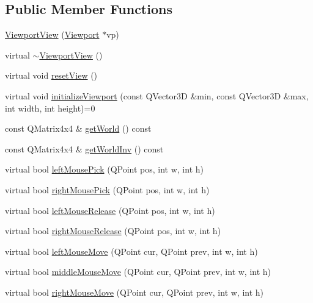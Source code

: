 \subsection*{Public Member Functions}
\begin{DoxyCompactItemize}
\item 
\hyperlink{classShipCAD_1_1ViewportView_a725088d3f0e113c97ae52cccab7fce42}{Viewport\-View} (\hyperlink{classShipCAD_1_1Viewport}{Viewport} $\ast$vp)
\item 
virtual \hyperlink{classShipCAD_1_1ViewportView_a75f58efbb601f46ea20b70b1370cee1a}{$\sim$\-Viewport\-View} ()
\item 
virtual void \hyperlink{classShipCAD_1_1ViewportView_ab70e778772325a67610d983f630c2c3d}{reset\-View} ()
\item 
virtual void \hyperlink{classShipCAD_1_1ViewportView_ad1c89a6e34b7b3795a7f21e67181dc0f}{initialize\-Viewport} (const Q\-Vector3\-D \&min, const Q\-Vector3\-D \&max, int width, int height)=0
\item 
const Q\-Matrix4x4 \& \hyperlink{classShipCAD_1_1ViewportView_a0be1613b2ae2087da00811f2bdb0bd45}{get\-World} () const 
\item 
const Q\-Matrix4x4 \& \hyperlink{classShipCAD_1_1ViewportView_a6bffec9328b29bf40c868f2862daebe0}{get\-World\-Inv} () const 
\item 
virtual bool \hyperlink{classShipCAD_1_1ViewportView_ac1226ebc09cbc0ee33a53fc6fec9cd09}{left\-Mouse\-Pick} (Q\-Point pos, int w, int h)
\item 
virtual bool \hyperlink{classShipCAD_1_1ViewportView_a1e67e403d7307d3828336edbc1ded2f3}{right\-Mouse\-Pick} (Q\-Point pos, int w, int h)
\item 
virtual bool \hyperlink{classShipCAD_1_1ViewportView_ad74e96e8fef750466b2771f8fc48900a}{left\-Mouse\-Release} (Q\-Point pos, int w, int h)
\item 
virtual bool \hyperlink{classShipCAD_1_1ViewportView_aaeff27f9b32dc7ee98dbfc14b7eca804}{right\-Mouse\-Release} (Q\-Point pos, int w, int h)
\item 
virtual bool \hyperlink{classShipCAD_1_1ViewportView_a2dc46f8d032d707308cf853c70bc965a}{left\-Mouse\-Move} (Q\-Point cur, Q\-Point prev, int w, int h)
\item 
virtual bool \hyperlink{classShipCAD_1_1ViewportView_a44baf7aad8a3ba7ded04395a8765caf9}{middle\-Mouse\-Move} (Q\-Point cur, Q\-Point prev, int w, int h)
\item 
virtual bool \hyperlink{classShipCAD_1_1ViewportView_a537210f7c2872e7b8921341660e85347}{right\-Mouse\-Move} (Q\-Point cur, Q\-Point prev, int w, int h)

\end{DoxyCompactItemize}
